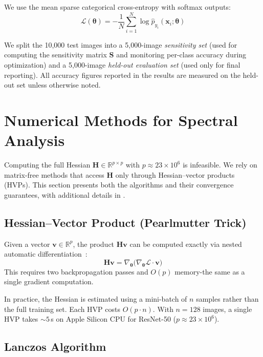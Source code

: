 \documentclass[11pt,a4paper]{article}
\newcommand{\R}{\mathbb{R}}
\newcommand{\mat}[1]{\bm{#1}}
\newcommand{\vect}[1]{\bm{#1}}
\newcommand{\Hess}{\mat{H}}
\begin{document}
We use the mean sparse categorical cross-entropy with softmax outputs:
\begin{equation}
\mathcal{L}(\vect{\theta}) = -\frac{1}{N} \sum_{i=1}^{N}
  \log \hat{p}_{y_i}(\vect{x}_i; \vect{\theta})
\label{eq:loss}
\end{equation}

We split the 10,000 test images into a 5,000-image
\emph{sensitivity set} (used for computing the sensitivity matrix
$\mat{S}$ and monitoring per-class accuracy during optimization) and
a 5,000-image \emph{held-out evaluation set} (used only for final
reporting). All accuracy figures reported in the results are measured
on the held-out set unless otherwise noted.

\section{Numerical Methods for Spectral Analysis}
\label{sec:numerical}

Computing the full Hessian $\Hess \in \R^{p \times p}$ with
$p \approx 23 \times 10^6$ is infeasible. We rely on matrix-free
methods that access $\Hess$ only through Hessian--vector products
(HVPs). This section presents both the algorithms and their convergence
guarantees, with additional details in .

\subsection{Hessian--Vector Product (Pearlmutter Trick)}
\label{sec:hvp}

Given a vector $\vect{v} \in \R^p$, the product $\Hess\vect{v}$ can
be computed exactly via nested automatic
differentiation~\cite{pearlmutter1994}:
\begin{equation}
\Hess \vect{v} = \nabla_{\vect{\theta}}
  \bigl(\nabla_{\vect{\theta}} \mathcal{L} \cdot \vect{v}\bigr)
\label{eq:hvp}
\end{equation}
This requires two backpropagation passes and $O(p)$ memory-the same
as a single gradient computation.

In practice, the Hessian is estimated using a mini-batch of $n$ samples
rather than the full training set. Each HVP costs $O(p \cdot n)$. With
$n = 128$ images, a single HVP takes ${\sim}5$\,s on Apple Silicon CPU
for ResNet-50 ($p \approx 23 \times 10^6$).

\subsection{Lanczos Algorithm}
\label{sec:lanczos}
\end{document}
